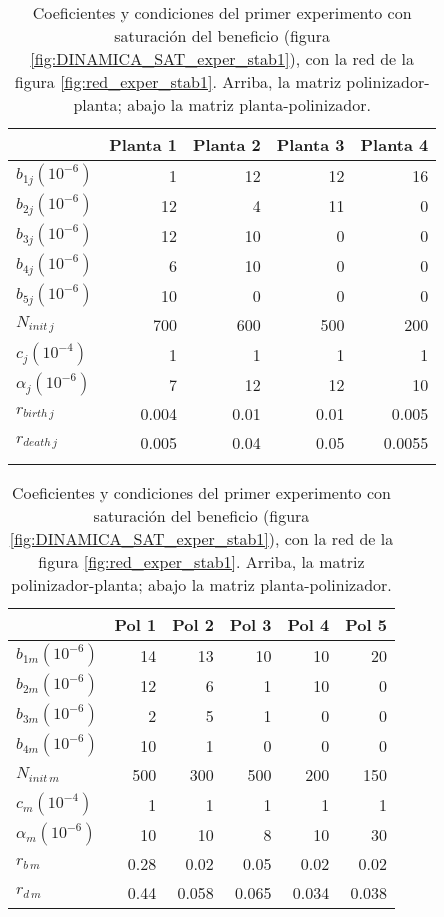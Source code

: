 \begin{table}[h!]
\centering
\footnotesize
\begin{tabular}{lrrrr}
\hline
 & Planta 1 & Planta 2 & Planta 3 & Planta 4  \\
\hline
$b_{1j}${\tiny $\left(10^{-6}\right)$} & 1 & 12 & 12 & 16\\
$b_{2j}${\tiny $\left(10^{-6}\right)$} & 12 & 4 & 11 & 0 \\
$b_{3j}${\tiny $\left(10^{-6}\right)$} & 12 & 10 & 0 & 0 \\
$b_{4j}${\tiny $\left(10^{-6}\right)$} & 6 & 10 & 0 & 0 \\
$b_{5j}${\tiny $\left(10^{-6}\right)$} & 10 & 0 & 0 & 0 \\
$N_{init\,j}$ & 700 & 600 & 500 & 200 \\
$c_{j}${\tiny $\left(10^{-4}\right)$} & 1 & 1 & 1 & 1 \\
$\alpha_{j}${\tiny $\left(10^{-6}\right)$} & 7 & 12 & 12 & 10 \\
$r_{birth\, j}$ & 0.004 & 0.01 & 0.01 & 0.005 \\
$r_{death\, j}$ & 0.005 & 0.04 & 0.05 & 0.0055 \\
\hline
\\
\end{tabular}
\begin{tabular}{lrrrrr}
\hline
 &Pol 1&Pol 2&Pol 3&Pol 4&Pol 5\\
\hline
$b_{1m}${\tiny $\left(10^{-6}\right)$}&14&13&10&10&20\\
$b_{2m}${\tiny $\left(10^{-6}\right)$}&12&6&1&10&0\\
$b_{3m}${\tiny $\left(10^{-6}\right)$}&2&5&1&0&0\\
$b_{4m}${\tiny $\left(10^{-6}\right)$}&10&1&0&0&0\\
$N_{init\,m}$ & 500 & 300 & 500 & 200 & 150 \\
$c_{m}${\tiny $\left(10^{-4}\right)$} & 1 & 1 & 1 & 1 & 1\\
$\alpha_{m}${\tiny $\left(10^{-6}\right)$} & 10 & 10 & 8 & 10 & 30\\
$r_{b\, m}$ & 0.28 & 0.02 & 0.05 & 0.02 & 0.02 \\
$r_{d\, m}$ & 0.44 & 0.058 & 0.065 & 0.034 & 0.038 \\
\hline
\end{tabular}
\normalsize
\caption{Coeficientes y condiciones del primer experimento con saturación del beneficio (figura \ref{fig:DINAMICA_SAT_exper_stab1}), con la red de la figura \ref{fig:red_exper_stab1}. Arriba, la matriz polinizador-planta; abajo la matriz planta-polinizador.}

\label{tab:SAT_experiment1}
\end{table}

